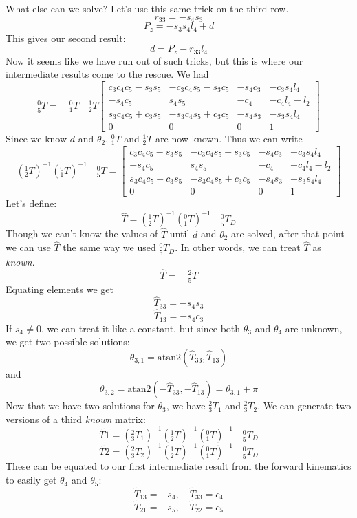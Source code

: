 \begin{ExampleCont}
What else can we solve?   Let's use this same trick on the third row.	%
\[
r_{33} = -s_4s_3
\]
\[
P_z = -s_3s_4l_4 + d
\]
This   gives our second result:	%
\[
d = P_z - r_{33}l_4
\]
Now it seems like we have run out of  such tricks, but this is where our intermediate results	%
come to the rescue. We had	%
\[
^0_5T= \quad ^0_1T \quad ^1_2T
\left[
\begin{array}{cccc}
c_3c_4c_5-s_3s_5 & -c_3c_4s_5-s_3c_5 & -s_4c_3 & -c_3s_4l_4 \\
-s_4c_5 & s_4s_5 & -c_4 & -c_4l_4-l_2 \\
s_3c_4c_5+c_3s_5 & -s_3c_4s_5+c_3c_5 & -s_4s_3 & -s_3s_4l_4 \\
0 & 0 & 0 & 1
\end{array}
\right]
\]
Since we know $d$ and $\theta_2$, $^0_1T$ and $ ^1_2T$ are now known.  Thus we	%
can write	%
\[
(^1_2T)^{-1}   (^0_1T)^{-1} \quad  {^0_5T} =
\left[
\begin{array}{cccc}
c_3c_4c_5-s_3s_5 & -c_3c_4s_5-s_3c_5 & -s_4c_3 & -c_3s_4l_4 \\
-s_4c_5 & s_4s_5 & -c_4 & -c_4l_4-l_2 \\
s_3c_4c_5+c_3s_5 & -s_3c_4s_5+c_3c_5 & -s_4s_3 & -s_3s_4l_4 \\
0 & 0 & 0 & 1
\end{array}
\right]
\]
Let's define:
\[
\hat{T} = (^1_2T)^{-1}   (^0_1T)^{-1}  \quad {^0_5T_D}
\]
Though we
can't know the values of $\hat{T}$ until $d$ and $\theta_2$ are solved,  after that
point  we can use $\hat{T}$ the same way we used $^0_5T_D$. In other words, we can treat $\hat{T}$ as {\it known}.
\[
\hat{T} = \quad ^2_5T
\]
%
Equating elements we get
\[
\hat{T}_{33} = -s_4s_3
\]
\[
\hat{T}_{13} = -s_4c_3
\]
If $s_4 \neq 0$, we can treat it like a constant, but since both $\theta_3$ and	%
$\theta_4$ are unknown, we get two possible solutions:	%
\[
\theta_{3,1} = \mathrm{atan2}(\hat{T}_{33},\hat{T}_{13} )
\]
and	%
\[
\theta_{3,2} = \mathrm{atan2}(-\hat{T}_{33},-\hat{T}_{13}) = \theta_{3,1}+ \pi
\]
Now that we have two solutions for $\theta_3$, we have $^2_3T_1$ and  $^2_3T_2$.	%
We can   generate two versions of a third {\it known} matrix:	%
\[
\tilde{T1} = (^2_3T_1)^{-1} (^1_2T)^{-1}   (^0_1T)^{-1}  \quad {^0_5T_D}
\]
\[
\tilde{T2} = (^2_3T_2)^{-1} (^1_2T)^{-1}   (^0_1T)^{-1}  \quad {^0_5T_D}
\]
These can be equated to our first intermediate result from the forward	%
kinematics to easily get $\theta_4$ and $\theta_5$:	%
\[
\tilde{T}_{13} = -s_4, \quad \tilde{T}_{33}= c_4
\]
\[
\tilde{T}_{21} = -s_5, \quad \tilde{T}_{22}= c_5
\]

\end{ExampleCont}
